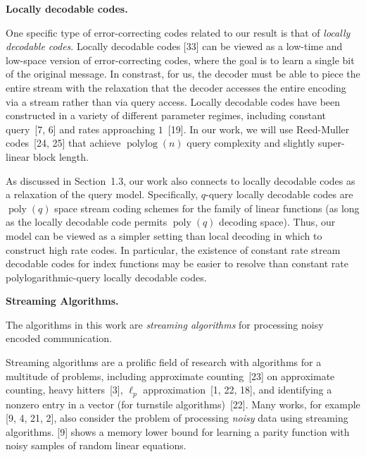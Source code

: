 \documentclass[10pt,a4paper]{article}
\begin{document}
\par\medskip\noindent\textbf{Locally decodable codes.}\par




One specific type of error-correcting codes related to our result is that of \emph{locally decodable codes}. Locally decodable codes [33] can be viewed as a low-time and low-space version of error-correcting codes, where the goal is to learn a single bit of the original message. In constrast, for us, the decoder must be able to piece the entire stream with the relaxation that the decoder accesses the entire encoding via a stream rather than via query access. Locally decodable codes have been constructed in a variety of different parameter regimes, including constant query [7, 6] and rates approaching $1$ [19]. In our work, we will use Reed-Muller codes [24, 25] that achieve $\operatorname{polylog}(n)$ query complexity and slightly super-linear block length.\par




As discussed in Section 1.3, our work also connects to locally decodable codes as a relaxation of the query model. Specifically, $q$-query locally decodable codes are $\operatorname{poly}(q)$ space stream coding schemes for the family of linear functions (as long as the locally decodable code permits $\operatorname{poly}(q)$ decoding space). Thus, our model can be viewed as a simpler setting than local decoding in which to construct high rate codes. In particular, the existence of constant rate stream decodable codes for index functions may be easier to resolve than constant rate polylogarithmic-query locally decodable codes.\par





\par\medskip\noindent\textbf{Streaming Algorithms.}\par




The algorithms in this work are \emph{streaming algorithms} for processing noisy encoded communication.\par




Streaming algorithms are a prolific field of research with algorithms for a multitude of problems, including approximate counting [23] on approximate counting, heavy hitters [3], $\ell_{p}$ approximation [1, 22, 18], and identifying a nonzero entry in a vector (for turnstile algorithms) [22]. Many works, for example [9, 4, 21, 2], also consider the problem of processing \emph{noisy} data using streaming algorithms. [9] shows a memory lower bound for learning a parity function with noisy samples of random linear equations.\par
\end{document}
